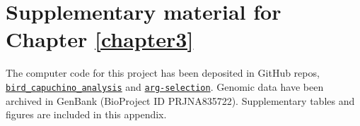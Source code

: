 \chapter{Supplementary material for Chapter \ref{chapter3}} \label{appxB}

The computer code for this project has been deposited in GitHub repos, \href{https://github.com/CshlSiepelLab/bird_capuchino_analysis}{\texttt{bird\_capuchino\_analysis}} and \href{https://github.com/CshlSiepelLab/arg-selection}{\texttt{arg-selection}}. Genomic data have been archived in GenBank (BioProject ID PRJNA835722). Supplementary tables and figures are included in this appendix.


